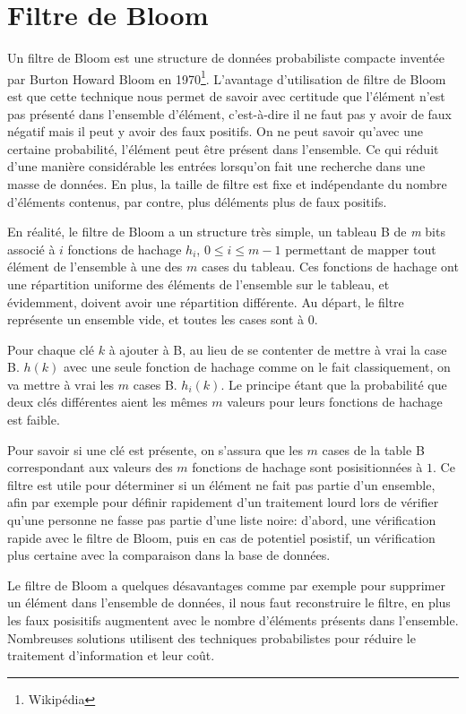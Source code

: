 \chapter{Filtre de Bloom}
	Un filtre de Bloom est une structure de données probabiliste compacte inventée par Burton Howard Bloom en 1970\footnote{Wikipédia}. L'avantage d'utilisation de filtre de Bloom est que cette technique nous permet de savoir avec certitude que l'élément n'est pas présenté dans l'ensemble d'élément, c'est-à-dire il ne faut pas y avoir de faux négatif mais il peut y avoir des faux positifs. On ne peut savoir qu'avec une certaine probabilité, l'élément peut être présent dans l'ensemble. Ce qui réduit d'une manière considérable les entrées lorsqu'on fait une recherche dans une masse de données. En plus, la taille de filtre est fixe et indépendante du nombre d'éléments contenus, par contre, plus déléments plus de faux positifs.
	
	En réalité, le filtre de Bloom a un structure très simple, un tableau B de \textit{m} bits associé à $i$ fonctions de hachage $h_i$, $0 \leq i \leq m - 1$ permettant de mapper tout élément de l'ensemble à une des $m$ cases du tableau. Ces fonctions de hachage ont une répartition uniforme des éléments de l'ensemble sur le tableau, et évidemment, doivent avoir une répartition différente. Au départ, le filtre représente un ensemble vide, et toutes les cases sont à 0.
	
	Pour chaque clé $k$ à ajouter à B, au lieu de se contenter de mettre à vrai la case B. $h(k)$ avec une seule fonction de hachage comme on le fait classiquement, on va mettre à vrai les $m$ cases B. $h_i(k)$. Le principe étant que la probabilité que deux clés différentes aient les mêmes $m$ valeurs pour leurs fonctions de hachage est faible.
	
	Pour savoir si une clé est présente, on s'assura que les $m$ cases de la table B correspondant aux valeurs des $m$ fonctions de hachage sont posisitionnées à $1$. Ce filtre est utile pour déterminer si un élément ne fait pas partie d'un ensemble, afin par exemple pour définir rapidement d'un traitement lourd lors de vérifier qu'une personne ne fasse pas partie d'une liste noire: d'abord, une vérification rapide avec le filtre de Bloom, puis en cas de potentiel posistif, un vérification plus certaine avec la comparaison dans la base de données.
	
	Le filtre de Bloom a quelques désavantages comme par exemple pour supprimer un élément dans l'ensemble de données, il nous faut reconstruire le filtre, en plus les faux posisitifs augmentent avec le nombre d'éléments présents dans l'ensemble. Nombreuses solutions utilisent des techniques probabilistes pour réduire le traitement d'information et leur coût.
	
